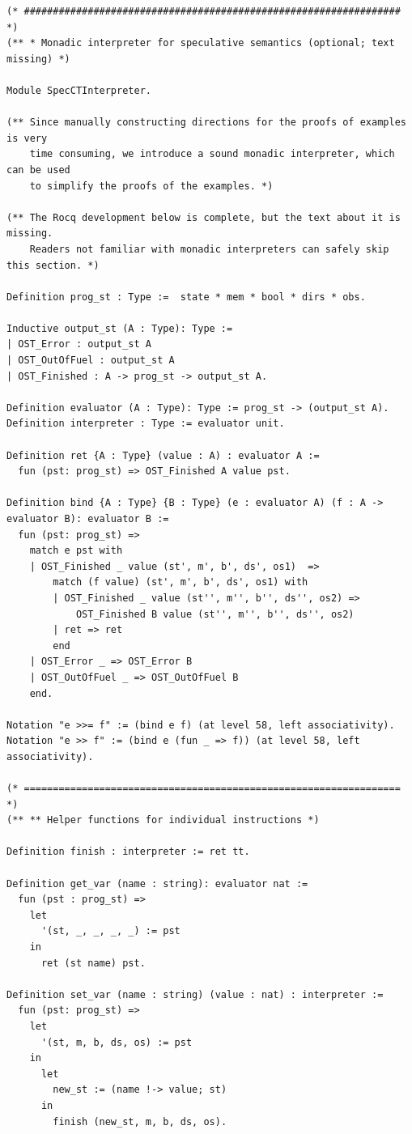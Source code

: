 \documentclass[12pt]{report}
\begin{document}
\begin{verbatim}
(* ################################################################# *)
(** * Monadic interpreter for speculative semantics (optional; text missing) *)

Module SpecCTInterpreter.

(** Since manually constructing directions for the proofs of examples is very
    time consuming, we introduce a sound monadic interpreter, which can be used
    to simplify the proofs of the examples. *)

(** The Rocq development below is complete, but the text about it is missing.
    Readers not familiar with monadic interpreters can safely skip this section. *)

Definition prog_st : Type :=  state * mem * bool * dirs * obs.

Inductive output_st (A : Type): Type :=
| OST_Error : output_st A
| OST_OutOfFuel : output_st A
| OST_Finished : A -> prog_st -> output_st A.

Definition evaluator (A : Type): Type := prog_st -> (output_st A).
Definition interpreter : Type := evaluator unit.

Definition ret {A : Type} (value : A) : evaluator A :=
  fun (pst: prog_st) => OST_Finished A value pst.

Definition bind {A : Type} {B : Type} (e : evaluator A) (f : A -> evaluator B): evaluator B :=
  fun (pst: prog_st) =>
    match e pst with
    | OST_Finished _ value (st', m', b', ds', os1)  =>
        match (f value) (st', m', b', ds', os1) with
        | OST_Finished _ value (st'', m'', b'', ds'', os2) =>
            OST_Finished B value (st'', m'', b'', ds'', os2)
        | ret => ret
        end
    | OST_Error _ => OST_Error B
    | OST_OutOfFuel _ => OST_OutOfFuel B
    end.

Notation "e >>= f" := (bind e f) (at level 58, left associativity).
Notation "e >> f" := (bind e (fun _ => f)) (at level 58, left associativity).

(* ================================================================= *)
(** ** Helper functions for individual instructions *)

Definition finish : interpreter := ret tt.

Definition get_var (name : string): evaluator nat :=
  fun (pst : prog_st) =>
    let
      '(st, _, _, _, _) := pst
    in
      ret (st name) pst.

Definition set_var (name : string) (value : nat) : interpreter :=
  fun (pst: prog_st) =>
    let
      '(st, m, b, ds, os) := pst
    in
      let
        new_st := (name !-> value; st)
      in
        finish (new_st, m, b, ds, os).


\end{verbatim}
\end{document}
